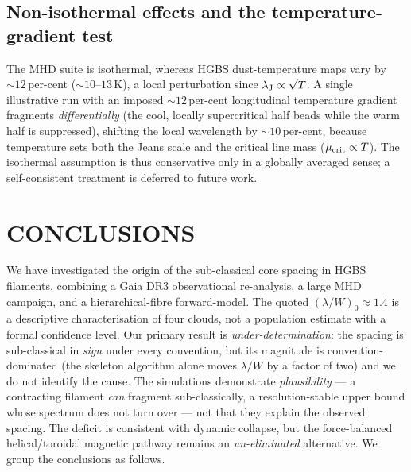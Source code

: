 \documentclass[usenatbib,twoside,twocolumn]{mnras}
\begin{document}
\subsection{Non-isothermal effects and the temperature-gradient test}
\label{sec:mt_variation}

The MHD suite is isothermal, whereas HGBS dust-temperature maps vary by $\sim12$\,per-cent ($\sim10$--$13$\,K), a local perturbation since $\lambda_{\rm J}\propto\sqrt{T}$. A single illustrative run with an imposed $\sim12$\,per-cent longitudinal temperature gradient fragments \emph{differentially} (the cool, locally supercritical half beads while the warm half is suppressed), shifting the local wavelength by $\sim10$\,per-cent, because temperature sets both the Jeans scale and the critical line mass ($\mu_{\rm crit}\propto T$). The isothermal assumption is thus conservative only in a globally averaged sense; a self-consistent treatment is deferred to future work.


\section{CONCLUSIONS}

We have investigated the origin of the sub-classical core spacing in HGBS filaments, combining a Gaia DR3 observational re-analysis, a large MHD campaign, and a hierarchical-fibre forward-model. The quoted $(\lambda/W)_0\approx1.4$ is a descriptive characterisation of four clouds, not a population estimate with a formal confidence level. Our primary result is \emph{under-determination}: the spacing is sub-classical in \emph{sign} under every convention, but its magnitude is convention-dominated (the skeleton algorithm alone moves $\lambda/W$ by a factor of two) and we do not identify the cause. The simulations demonstrate \emph{plausibility} --- a contracting filament \emph{can} fragment sub-classically, a resolution-stable upper bound whose spectrum does not turn over --- not that they explain the observed spacing. The deficit is consistent with dynamic collapse, but the force-balanced helical/toroidal magnetic pathway remains an \emph{un-eliminated} alternative. We group the conclusions as follows.
\end{document}
